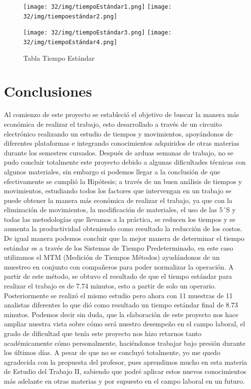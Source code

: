     \begin{figure}[H]
        \centering
        \texttt{[image: 32/img/tiempoEstándar1.png]}
        \label{fig:enter-label}
         \centering
        \texttt{[image: 32/img/tiempoestándar2.png]}
         \centering
    \end{figure}
    \begin{figure}[H]
        \texttt{[image: 32/img/tiempoEstándar3.png]}
         \centering
        \texttt{[image: 32/img/tiempoEstándar4.png]}
         \caption{Tabla Tiempo Estándar}
         \label{fig:enter-label}
    \end{figure}
    
    \section{Conclusiones}
    Al comienzo de este proyecto se estableció el objetivo de buscar la manera más económica de realizar el trabajo, esto desarrollado a través de un circuito electrónico realizando un estudio de tiempos y movimientos, apoyándonos de diferentes plataformas e integrando conocimientos adquiridos de otras materias durante los semestres cursados.
    Después de arduas semanas de trabajo, no se pudo concluir totalmente este proyecto debido a algunas dificultades técnicas con algunos materiales, sin embargo si podemos llegar a la conclusión de que efectivamente se cumplió la Hipótesis; a través de un buen análisis de tiempos y movimientos, estudiando todos los factores que intervengan en un trabajo se puede obtener la manera más económica de realizar el trabajo, ya que con la eliminación de movimientos, la modificación de materiales, el uso de las 5´S y todas las metodologías que llevamos a la práctica, se reducen los tiempos y se aumenta la productividad  obteniendo como resultado la reducción de los costos.
    De igual manera podemos concluir que la mejor manera de determinar el tiempo estándar es a través de los Sistemas de Tiempo Predeterminado, en este caso utilizamos el MTM (Medición de Tiempos Métodos) ayudándonos de un muestreo en conjunto con compañeros para poder normalizar la operación. A partir de este método, se obtuvo el resultado de que el tiempo estándar para realizar el trabajo es de 7.74 minutos, esto a partir de solo un operario. Posteriormente se realizó el mismo estudio pero ahora con 11 muestras de 11 analistas diferentes lo que dió como resultado un tiempo estándar final de 8.73 minutos.
    Podemos decir sin duda, que la elaboración de este proyecto nos hace ampliar nuestra vista sobre cómo será nuestro desempeño en el campo laboral, el grado de dificultad que tenía este proyecto nos hizo retarnos tanto académicamente cómo personalmente, haciéndonos trabajar bajo presión durante los últimos días. A pesar de que no se concluyó totalmente, yo me quedo agradecida con la propuesta del profesor, pues aprendimos mucho en esta materia de Estudio del Trabajo II, sabiendo que podré aplicar estos nuevos conocimientos más adelante en otras materias y por supuesto en el campo laboral en un futuro.
